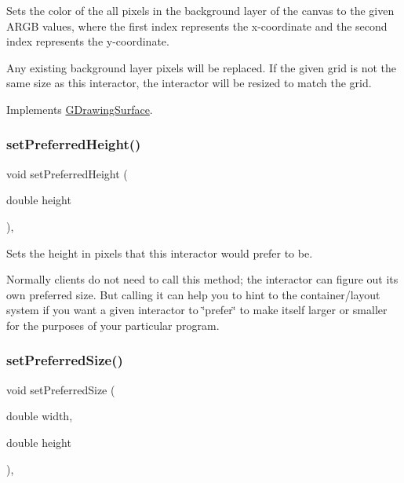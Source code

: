 Sets the color of the all pixels in the background layer of the canvas to the given A\+R\+GB values, where the first index represents the x-\/coordinate and the second index represents the y-\/coordinate. 

Any existing background layer pixels will be replaced. If the given grid is not the same size as this interactor, the interactor will be resized to match the grid. 

Implements \mbox{\hyperlink{classsgl_1_1GDrawingSurface_aca49553c1565ae50ee667bdeab5b726c}{G\+Drawing\+Surface}}.

\mbox{\label{classsgl_1_1GInteractor_a1ab987704fce32098706c6f00fb08218}} 
\subsubsection{\texorpdfstring{set\+Preferred\+Height()}{setPreferredHeight()}}
{\footnotesize\ttfamily void set\+Preferred\+Height (\begin{DoxyParamCaption}\item[{double}]{height }\end{DoxyParamCaption})\hspace{0.3cm}{\ttfamily [virtual]}, {\ttfamily [inherited]}}



Sets the height in pixels that this interactor would prefer to be. 

Normally clients do not need to call this method; the interactor can figure out its own preferred size. But calling it can help you to hint to the container/layout system if you want a given interactor to \char`\"{}prefer\char`\"{} to make itself larger or smaller for the purposes of your particular program. \mbox{\label{classsgl_1_1GInteractor_a042c5ae19430d765ef552371cae3632c}} 
\subsubsection{\texorpdfstring{set\+Preferred\+Size()}{setPreferredSize()}\hspace{0.1cm}{\footnotesize\ttfamily [1/2]}}
{\footnotesize\ttfamily void set\+Preferred\+Size (\begin{DoxyParamCaption}\item[{double}]{width,  }\item[{double}]{height }\end{DoxyParamCaption})\hspace{0.3cm}{\ttfamily [virtual]}, {\ttfamily [inherited]}}



